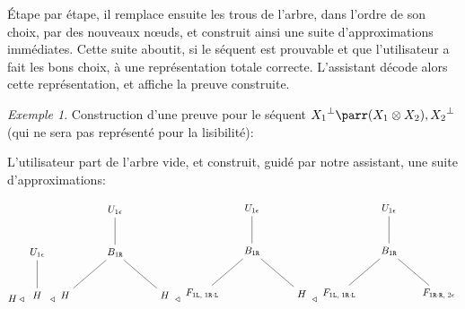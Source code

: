 \documentclass[11pt,a4paper]{article}
\theoremstyle{plain}
\theoremstyle{definition}
\theoremstyle{remark}
\newtheorem{example}{Exemple}
\newcommand*{\orth}{^\perp}
\newcommand*{\tensor}{\otimes}
\newcommand*{\Left}{\textnormal{\texttt{L}}}
\newcommand*{\Right}{\textnormal{\texttt{R}}}
\newcommand*{\relapprox}{\ensuremath{\triangleleft}}
\newcommand*{\unknown}{H}
\begin{document}
Étape par étape, il remplace ensuite les trous de l'arbre, dans l'ordre de son choix, par des nouveaux n\oe{}uds, et construit ainsi une suite d'approximations immédiates. Cette suite aboutit, si le séquent est prouvable et que l'utilisateur a fait les bons choix, à une représentation totale correcte. L'assistant décode alors cette représentation, et affiche la preuve construite.

\begin{example}
    Construction d'une preuve pour le séquent ${X_1}\orth \parr (X_1 \tensor X_2), {X_2}\orth$ (qui ne sera pas représenté pour la lisibilité):

    L'utilisateur part de l'arbre vide, et construit, guidé par notre assistant, une suite d'approximations:

    \begin{align*}
    \begin{multlined}
        \unknown 
        \relapprox
        \begin{tikzpicture}%
            [level distance=1.5cm,
            level 2/.style={sibling distance=3.5cm}]
            \node {$U_{1 \epsilon}$}
            child {node {$\unknown$}
            };
        \end{tikzpicture}
        \relapprox
        \begin{tikzpicture}%
            [level distance=1.5cm,
            level 2/.style={sibling distance=3.5cm}]
            \node {$U_{1 \epsilon}$}
            child {node {$B_{1 \Right}$}
                child {node {$\unknown$}}
                child {node {$\unknown$}}
            };
        \end{tikzpicture}
        \relapprox
        \begin{tikzpicture}%
            [level distance=1.5cm,
            level 2/.style={sibling distance=3.5cm}]
            \node {$U_{1 \epsilon}$}
            child {node {$B_{1 \Right}$}
                child {node {$F_{1 \Left, \; 1 \Right \cdot \Left}$}}
                child {node {$\unknown$}}
            };
        \end{tikzpicture}
        \relapprox
        \begin{tikzpicture}%
            [level distance=1.5cm,
            level 2/.style={sibling distance=3.5cm}]
            \node {$U_{1 \epsilon}$}
            child {node {$B_{1 \Right}$}
                child {node {$F_{1 \Left, \; 1 \Right \cdot \Left}$}}
                child {node {$F_{1 \Right \cdot \Right, \; 2 \epsilon}$}}
            };
        \end{tikzpicture}
    \end{multlined}
    \end{align*}


\end{example}
\end{document}
